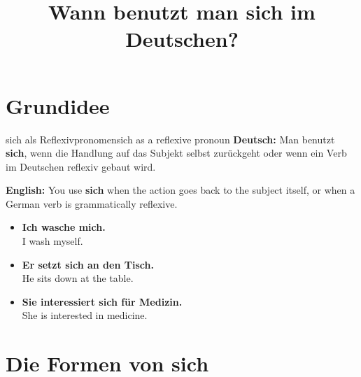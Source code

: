 \documentclass[a4paper,11pt]{article}
\title{Wann benutzt man \glqq sich\grqq{} im Deutschen?}
\date{}
\newcommand{\GermanText}[1]{\textbf{Deutsch: }#1\par}
\newcommand{\EnglishText}[1]{{\small\color{SoftGray}\textbf{English: }#1\par}}
\newcommand{\ExampleItem}[2]{\item \textbf{#1}\\{\small\color{SoftGray}#2}}
\begin{document}
    \maketitle
    \tableofcontents
    \newpage
    
    
    \section{Grundidee}
        
        \begin{grammarentry}{sich als Reflexivpronomen}{sich as a reflexive pronoun}
            \GermanText{Man benutzt \textbf{sich}, wenn die Handlung auf das Subjekt selbst zurückgeht oder wenn ein Verb im Deutschen reflexiv gebaut wird.}
            \EnglishText{You use \textbf{sich} when the action goes back to the subject itself, or when a German verb is grammatically reflexive.}
            
            \begin{exbox}
                \begin{itemize}
                    \ExampleItem{Ich wasche mich.}{I wash myself.}
                    \ExampleItem{Er setzt sich an den Tisch.}{He sits down at the table.}
                    \ExampleItem{Sie interessiert sich für Medizin.}{She is interested in medicine.}
                \end{itemize}
            \end{exbox}
        \end{grammarentry}
    
    
    \section{Die Formen von sich}
        
\end{document}
